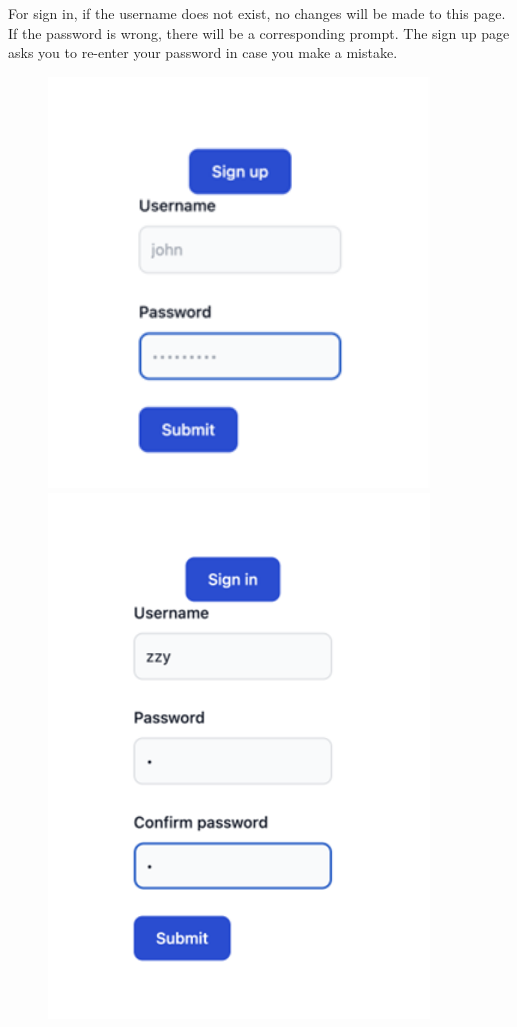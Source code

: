 \documentclass[singlecolumn]{article}
\begin{document}
For sign in, if the username does not exist, no changes will be made to this page. If the password is wrong, there will be a corresponding prompt. The sign up page asks you to re-enter your password in case you make a mistake. 

\begin{figure}[H]
    \centering
    \begin{minipage}[c]{0.3\textwidth}
    \centering
    \includegraphics[width=0.9\textwidth]{sign.png}
    \end{minipage}%
    \begin{minipage}[c]{0.3\textwidth}
    \centering
    \includegraphics[width=0.9\textwidth]{sign_up.png}

\end{minipage}
\end{figure}
\end{document}
